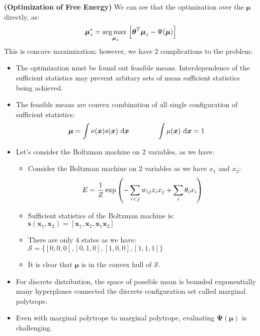 \begin{remark}{\textbf{(Optimization of Free Energy)}}
    We can see that the optimization over the $\boldsymbol \mu$ directly, as:
    \begin{equation*}
        \boldsymbol \mu_z^* = \underset{\boldsymbol \mu_z}{\arg\max \ }\Big[ \boldsymbol \theta^T\boldsymbol \mu_z - \Psi(\boldsymbol \mu) \Big]
    \end{equation*}
    This is concave maximization; however, we have $2$ complications to the problem:
    \begin{itemize}
        \item The optimization must be found out feasible means. Interdependence of the sufficient statistics may prevent arbitary sets of mean sufficient statistics being achieved.
        \item The feasible means are convex combination of all single configuration of sufficient statistics:
        \begin{equation*}
            \boldsymbol \mu = \int \nu(\boldsymbol x)s(\boldsymbol x)\ \mathrm{d} \boldsymbol x \qquad \qquad \int \mu(\boldsymbol x)\ \mathrm{d} \boldsymbol x = 1
        \end{equation*}
        \item Let's consider the Boltzman machine on $2$ variables, as we have:
        \begin{itemize}
            \item Consider the Boltzman machine on $2$ variables as we have $x_1$ and $x_2$:
            \begin{equation*}
                E = \frac{1}{Z}\exp\left( -\sum_{i < j}w_{ij}x_ix_j + \sum_i\theta_ix_i \right)
            \end{equation*}
            \item Sufficient statistics of the Boltzman machine is: $\boldsymbol s(\boldsymbol x_1, \boldsymbol x_2) = [\boldsymbol x_1,\boldsymbol x_2, \boldsymbol x_1\boldsymbol x_2]$
            \item There are only $4$ states as we have: $\mathcal{S} = \{ [0,0,0], [0,1,0], [1,0,0], [1,1,1] \}$
            \item It is clear that $\boldsymbol \mu$ is in the convex hull of $\mathcal{S}$. 
        \end{itemize}
        \item For discrete distribution, the space of possible mean is bounded exponentially many hyperplanes connected the discrete configuration set called marginal polytrope.
        \item Even with marginal polytrope to marginal polytrope, evaluating $\boldsymbol\Psi(\boldsymbol \mu)$ is challenging.
    \end{itemize}
\end{remark}

